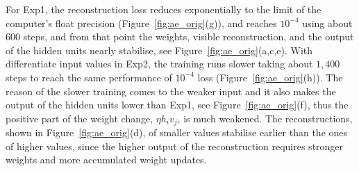 For Exp1, the reconstruction loss reduces exponentially to the limit of the computer's float precision (Figure~\ref{fig:ae_orig}(g)), and reaches $10^{-4}$ using about 600 steps, and from that point the weights, visible reconstruction, and the output of the hidden units nearly stabilise, see Figure~\ref{fig:ae_orig}(a,c,e).
With differentiate input values in Exp2, the training runs slower taking about $1,400$ steps to reach the same performance of $10^{-4}$ loss (Figure~\ref{fig:ae_orig}(h)).
The reason of the slower training comes to the weaker input and it also makes the output of the hidden units lower than Exp1, see Figure~\ref{fig:ae_orig}(f), thus the positive part of the weight change, $\eta h_i v_j$, is much weakened. 
The reconstructions, shown in Figure~\ref{fig:ae_orig}(d), of smaller values stabilise earlier than the ones of higher values, since the higher output of the reconstruction requires stronger weights and more accumulated weight updates. 
